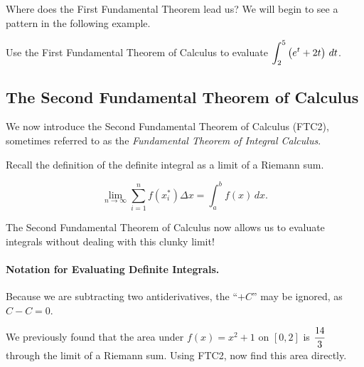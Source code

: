 \documentclass[12pt]{article}
\begin{document}
Where does the First Fundamental Theorem lead us? We will begin to see a pattern in the following example.

\newpage

\Example Use the First Fundamental Theorem of Calculus to evaluate $\displaystyle\int_2^5\left( e^t+2t\right)\,dt$.

\vspace{60mm}

\subsection*{The Second Fundamental Theorem of Calculus}

We now introduce the Second Fundamental Theorem of Calculus (FTC2), sometimes referred to as the \textit{Fundamental Theorem of Integral Calculus}.

\vspace{5mm}


\vspace{5mm}

Recall the definition of the definite integral as a limit of a Riemann sum.

$$\lim_{n\to\infty}\sum_{i=1}^n f(x_i^*)\Delta x=\int_a^b f(x)\,dx.$$

\vspace{3mm}

The Second Fundamental Theorem of Calculus now allows us to evaluate integrals without dealing with this clunky limit!

\vspace{5mm}

\paragraph{Notation for Evaluating Definite Integrals.}

\vspace{35mm}

Because we are subtracting two antiderivatives, the ``$+C$'' may be ignored, as $C-C=0$.

\newpage

\Example We previously found that the area under $f(x)=x^2+1$ on $[0,2]$ is $\displaystyle\frac{14}{3}$ through the limit of a Riemann sum. Using FTC2, now find this area directly.
\end{document}
